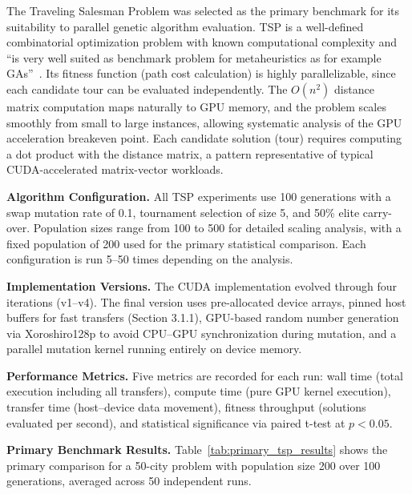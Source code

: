 \documentclass[a4paper,14pt]{extarticle}
\begin{document}

The Traveling Salesman Problem was selected as the primary benchmark for its suitability to parallel genetic algorithm evaluation. TSP is a well-defined combinatorial optimization problem with known computational complexity and ``is very well suited as benchmark problem for metaheuristics as for example GAs''~\cite{affenzeller2009genetic}. Its fitness function (path cost calculation) is highly parallelizable, since each candidate tour can be evaluated independently. The $O(n^2)$ distance matrix computation maps naturally to GPU memory, and the problem scales smoothly from small to large instances, allowing systematic analysis of the GPU acceleration breakeven point. Each candidate solution (tour) requires computing a dot product with the distance matrix, a pattern representative of typical CUDA-accelerated matrix-vector workloads.

\textbf{Algorithm Configuration.} All TSP experiments use 100 generations with a swap mutation rate of 0.1, tournament selection of size 5, and 50\% elite carry-over. Population sizes range from 100 to 500 for detailed scaling analysis, with a fixed population of 200 used for the primary statistical comparison. Each configuration is run 5--50 times depending on the analysis.

\textbf{Implementation Versions.} The CUDA implementation evolved through four iterations (v1--v4). The final version uses pre-allocated device arrays, pinned host buffers for fast transfers (Section 3.1.1), GPU-based random number generation via Xoroshiro128p to avoid CPU--GPU synchronization during mutation, and a parallel mutation kernel running entirely on device memory.

\textbf{Performance Metrics.} Five metrics are recorded for each run: wall time (total execution including all transfers), compute time (pure GPU kernel execution), transfer time (host--device data movement), fitness throughput (solutions evaluated per second), and statistical significance via paired t-test at $p < 0.05$.


\textbf{Primary Benchmark Results.} Table~\ref{tab:primary_tsp_results} shows the primary comparison for a 50-city problem with population size 200 over 100 generations, averaged across 50 independent runs.
\end{document}
